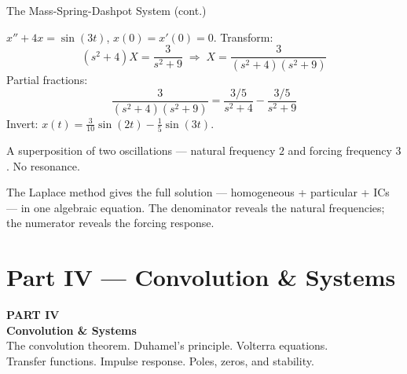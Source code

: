 \documentclass[aspectratio=169,11pt]{beamer}
\begin{document}
\begin{frame}{The Mass-Spring-Dashpot System (cont.)}
\footnotesize
\begin{examplebox}
$x'' + 4x = \sin(3t)$, $x(0) = x'(0) = 0$. Transform:
\[(s^2+4)X = \frac{3}{s^2+9} \;\Rightarrow\; X = \frac{3}{(s^2+4)(s^2+9)}\]
Partial fractions:
\[\frac{3}{(s^2+4)(s^2+9)} = \frac{3/5}{s^2+4} - \frac{3/5}{s^2+9}\]
Invert: $x(t) = \tfrac{3}{10}\sin(2t) - \tfrac{1}{5}\sin(3t)$.

A superposition of two oscillations --- natural frequency $2$ and forcing frequency $3$. No resonance.
\end{examplebox}
\vspace{0.5mm}
\begin{conceptbox}
The Laplace method gives the full solution --- homogeneous + particular + ICs --- in one algebraic equation. The denominator reveals the natural frequencies; the numerator reveals the forcing response.
\end{conceptbox}
\end{frame}


\section{Part IV --- Convolution \& Systems}

{
\begin{frame}[plain]
\vspace{2cm}
{\color{accentorange}\Huge\textbf{PART IV}}\\[0.4cm]
{\color{white}\Huge\textbf{Convolution \& Systems}}\\[0.8cm]
{\color{white!85}\large The convolution theorem. Duhamel's principle. Volterra equations.\\
Transfer functions. Impulse response. Poles, zeros, and stability.}
\end{frame}
}
\end{document}
